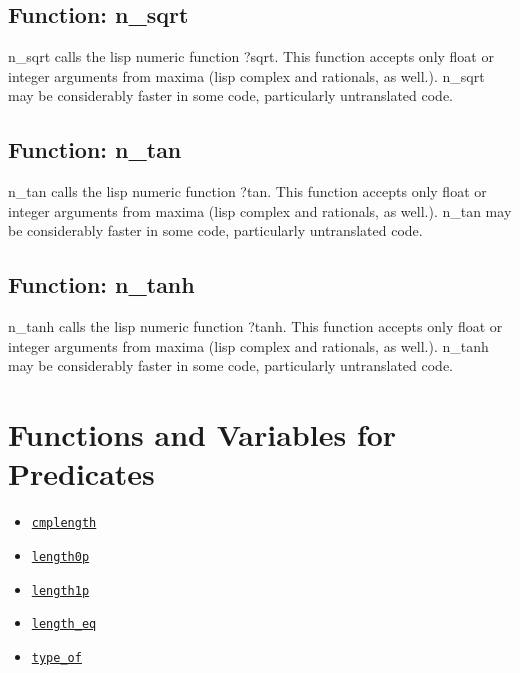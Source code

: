 \documentclass[]{article}
\begin{document}
\vspace{5 pt}


\subsection{Function: n\_sqrt\label{sec:n_sqrt}}
\hypertarget{n_sqrt}{}



\vspace{5 pt}
n\_sqrt calls the lisp numeric function ?sqrt. This function accepts only float or integer arguments from maxima (lisp complex and rationals, as well.). n\_sqrt may be considerably faster in some code, particularly untranslated code. 

\vspace{5 pt}


\subsection{Function: n\_tan\label{sec:n_tan}}
\hypertarget{n_tan}{}



\vspace{5 pt}
n\_tan calls the lisp numeric function ?tan. This function accepts only float or integer arguments from maxima (lisp complex and rationals, as well.). n\_tan may be considerably faster in some code, particularly untranslated code. 

\vspace{5 pt}


\subsection{Function: n\_tanh\label{sec:n_tanh}}
\hypertarget{n_tanh}{}



\vspace{5 pt}
n\_tanh calls the lisp numeric function ?tanh. This function accepts only float or integer arguments from maxima (lisp complex and rationals, as well.). n\_tanh may be considerably faster in some code, particularly untranslated code. 

\vspace{5 pt}


\section{Functions and Variables for Predicates}
\begin{itemize}
\item \hyperlink{cmplength}{{\tt cmplength}}
\item \hyperlink{length0p}{{\tt length0p}}
\item \hyperlink{length1p}{{\tt length1p}}
\item \hyperlink{length_eq}{{\tt length\_eq}}
\item \hyperlink{type_of}{{\tt type\_of}}
\end{itemize}
\end{document}
